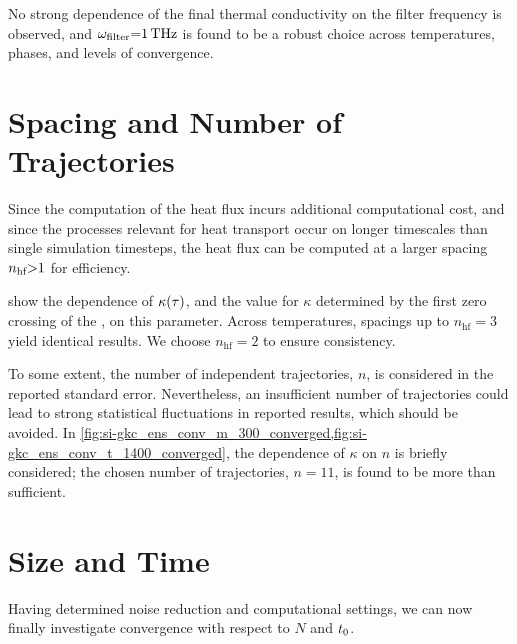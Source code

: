 No strong dependence of the final thermal conductivity on the filter frequency is observed, and $\omega_{\text{filter}}{=}\qty{1}{THz}$ is found to be a robust choice across temperatures, phases, and levels of convergence.


\section{Spacing and Number of Trajectories}
\label{sec:gkc_ens_n}

Since the computation of the heat flux incurs additional computational cost, and since the processes relevant for heat transport occur on longer timescales than single simulation timesteps, the heat flux can be computed at a larger spacing $n_{\text{hf}}{>}1$ for efficiency.

 show the dependence of $\kappa(\tau)$, and the value for $\kappa$ determined by the first zero crossing of the \hfacf, on this parameter. Across temperatures, spacings up to $n_{\text{hf}}{=}3$ yield identical results. We choose $n_{\text{hf}}{=}2$ to ensure consistency.

To some extent, the number of independent trajectories, $n$, is considered in the reported standard error. Nevertheless, an insufficient number of trajectories could lead to strong statistical fluctuations in reported results, which should be avoided. In \cref{fig:si-gkc_ens_conv_m_300_converged,fig:si-gkc_ens_conv_t_1400_converged}, the dependence of $\kappa$ on $n$ is briefly considered; the chosen number of trajectories, $n{=}11$, is found to be more than sufficient.


\section{Size and Time}
\label{sec:gkc_Nt}

Having determined noise reduction and computational settings, we can now finally investigate convergence with respect to $N$ and $t_0$. 

